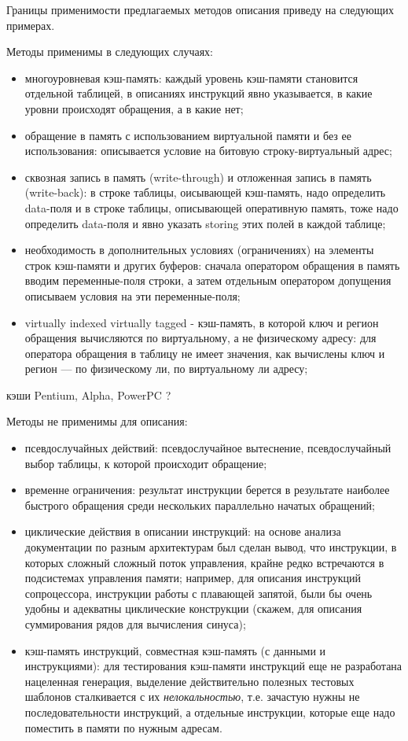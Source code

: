 \documentclass[14pt]{extreport}
\begin{document}
Границы применимости предлагаемых методов описания приведу на следующих примерах.

Методы применимы в следующих случаях:
\begin{itemize}
    \item многоуровневая кэш-память: каждый уровень кэш-памяти становится отдельной таблицей, в описаниях инструкций явно указывается, в какие уровни происходят обращения, а в какие нет;
    \item обращение в память с использованием виртуальной памяти и без ее использования: описывается условие на битовую строку-виртуальный адрес;
    \item сквозная запись в память (write-through) и отложенная запись в память (write-back): в строке таблицы, оисывающей кэш-память, надо определить data-поля и в строке таблицы, описывающей оперативную память, тоже надо определить data-поля и явно указать storing этих полей в каждой таблице;
    \item необходимость в дополнительных условиях (ограничениях) на элементы строк кэш-памяти и других буферов: сначала оператором обращения в память вводим переменные-поля строки, а затем отдельным оператором допущения описываем условия на эти переменные-поля;
    \item virtually indexed virtually tagged - кэш-память, в которой ключ и регион обращения вычисляются по виртуальному, а не физическому адресу: для оператора обращения в таблицу не имеет значения, как вычислены ключ и регион --- по физическому ли, по виртуальному ли адресу;
\end{itemize}

кэши Pentium, Alpha, PowerPC ?

Методы не применимы для описания:
\begin{itemize}
    \item псевдослучайных действий: псевдослучайное вытеснение, псевдослучайный выбор таблицы, к которой происходит обращение;
    \item временне ограничения: результат инструкции берется в результате наиболее быстрого обращения среди нескольких параллельно начатых обращений;
    \item циклические действия в описании инструкций: на основе анализа документации по разным архитектурам был сделан вывод, что инструкции, в которых сложный сложный поток управления, крайне редко встречаются в подсистемах управления памяти; например, для описания инструкций сопроцессора, инструкции работы с плавающей запятой, были бы очень удобны и адекватны циклические конструкции (скажем, для описания суммирования рядов для вычисления синуса);
    \item кэш-память инструкций, совместная кэш-память (с данными и инструкциями): для тестирования кэш-памяти инструкций еще не разработана нацеленная генерация, выделение действительно полезных тестовых шаблонов сталкивается с их \emph{нелокальностью}, т.е. зачастую нужны не последовательности инструкций, а отдельные инструкции, которые еще надо поместить в памяти по нужным адресам.
\end{itemize}
\end{document}
